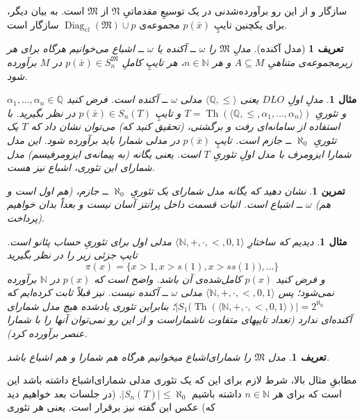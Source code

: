 \documentclass[12pt,a4paper]{article}
\theoremstyle{colorhead}
\newtheorem{tam}[thm]{تمرین}
\newtheorem{mesal}[thm]{مثال}
\newtheorem{defn}[thm]{تعریف}
\DeclareMathOperator{\Th}{Th}
\DeclareMathOperator{\diag}{Diag}
\begin{document}
سازگار و از این رو برآورده‌شدنی در یک توسیعِ مقدماتیِ
$\mathfrak{N}$
از
$\mathfrak{M}$
است. به بیان دیگر، برای یکچنین تایپِ
$p(\bar{x})$
مجموعه‌ی
$\diag_{el}(\mathfrak{M})\cup p$
سازگار است. 
\begin{defn}[مدل آکنده]
مدلِ
$\mathfrak{M}$
را
$\omega$ ــ
آکنده یا
$\omega$ ــ
اشباع 
می‌خوانیم هرگاه برای هر زیرمجموعه‌ی متناهیِ
$A\subseteq M$
و هر
$n\in \mathbb{N}$،
هر تایپِ کاملِ
$p(\bar{x})\in S_n^\mathfrak{M}$
در
$M$
برآورده شود.
\end{defn}
\begin{mesal}
مدلِ اولِ 
$DLO$
یعنی
$\langle \mathbb{Q},\leq\rangle$
مدلی
$\omega$ ــ
آکنده است. فرض کنید
$\alpha_1,\ldots,\alpha_n\in \mathbb{Q}$
و
تئوریِ
$T=\Th(\langle \mathbb{Q},\leq,\alpha_1,\ldots,\alpha_n\rangle)$
و تایپِ
$p(\bar{x})\in S_n(T)$
 در نظر بگیرید. با استفاده از سامانه‌ای رفت و برگشتی، (تحقیق کنید که) می‌توان نشان داد که
 $T$
 یک تئوریِ
 $\aleph_0$
 ــ
 جازم است.
تایپِ
$p(\bar{x})$
در مدلی شمارا باید برآورده شود. این مدل شمارا ایزومرف با مدل اولِ تئوریِ
$T$
است. یعنی یگانه 
(به پیمانه‌ی ایزومرفیسم)‌
مدل  شمارای این تئوری، اشباع 
 نیز هست. 
\end{mesal}
\begin{tam}
نشان دهید که یگانه مدل شمارای یک تئوریِ
$\aleph_0$ ــ
جازم، (هم اول است و هم) 
$\omega$ ــ
اشباع است. اثبات قسمت داخل پرانتز آسان نیست و بعداً بدان خواهیم پرداخت).
\end{tam}
\begin{mesal}
دیدیم که ساختارِ
$\langle \mathbb{N},+,\cdot,<,0,1\rangle$
مدلی اول برای تئوریِ
حساب پئانو است. تایپ جزئی زیر را در نظر بگیرید
\[
\pi(x)=\{x>1,x>s(1),x>ss(1)),\ldots\}
\]
و فرض کنید
$p(x)$
کامل‌شده‌ی آن باشد. واضح است که 
$p(x)$
در
$\mathbb{N}$
برآورده نمی‌شود؛ پس
$\langle \mathbb{N},+,\cdot,<,0,1\rangle$
مدلی 
$\omega$ ــ
آکنده نیست.  نیز قبلاً ثابت کرده‌ایم که 
\mbox{$|S_1(\Th(\langle \mathbb{N},+,\cdot,<,0,1\rangle)|=2^{\aleph_0}$؛}
بنابراین تئوری یادشده هیچ مدل 
شمارای آکنده‌ای  ندارد (تعداد تایپهای متفاوت ناشماراست و از این رو نمی‌توان آنها را با  شمارا عنصر برآورده کرد).
\end{mesal}
\begin{defn}
مدل
$\mathfrak{M}$
را شمارای‌اشباع
 میخوانیم هرگاه هم شمارا و هم اشباع باشد. 
\end{defn}
مطابقِ مثال بالا، شرط لازم برای این که یک تئوری مدلی شمارای‌اشباع داشته باشد این است که برای هر
$n\in \mathbb{N}$
داشته باشیم
$|S_n(T)|\leq \aleph_0$.
(در جلسات بعد خواهیم دید که)
عکس این گفته نیز برقرار است. یعنی هر تئوری 
\end{document}
